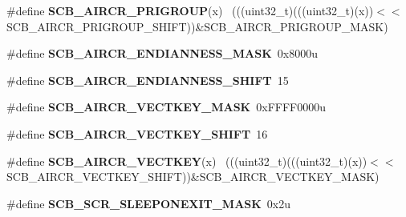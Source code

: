 \begin{DoxyCompactItemize}
\item 
\hypertarget{group___s_c_b___register___masks_ga0d0b66c12d03ab86d7027dbee98ee088}{}\#define {\bfseries S\+C\+B\+\_\+\+A\+I\+R\+C\+R\+\_\+\+P\+R\+I\+G\+R\+O\+U\+P}(x)                                    ~(((uint32\+\_\+t)(((uint32\+\_\+t)(x))$<$$<$S\+C\+B\+\_\+\+A\+I\+R\+C\+R\+\_\+\+P\+R\+I\+G\+R\+O\+U\+P\+\_\+\+S\+H\+I\+F\+T))\&S\+C\+B\+\_\+\+A\+I\+R\+C\+R\+\_\+\+P\+R\+I\+G\+R\+O\+U\+P\+\_\+\+M\+A\+S\+K)\label{group___s_c_b___register___masks_ga0d0b66c12d03ab86d7027dbee98ee088}

\item 
\hypertarget{group___s_c_b___register___masks_gad1fa2d88f03b66dea86171ebb636d936}{}\#define {\bfseries S\+C\+B\+\_\+\+A\+I\+R\+C\+R\+\_\+\+E\+N\+D\+I\+A\+N\+N\+E\+S\+S\+\_\+\+M\+A\+S\+K}~0x8000u\label{group___s_c_b___register___masks_gad1fa2d88f03b66dea86171ebb636d936}

\item 
\hypertarget{group___s_c_b___register___masks_ga2ac1c32de13b48a92bc48bbcee891976}{}\#define {\bfseries S\+C\+B\+\_\+\+A\+I\+R\+C\+R\+\_\+\+E\+N\+D\+I\+A\+N\+N\+E\+S\+S\+\_\+\+S\+H\+I\+F\+T}~15\label{group___s_c_b___register___masks_ga2ac1c32de13b48a92bc48bbcee891976}

\item 
\hypertarget{group___s_c_b___register___masks_ga0929f6fe9ab80dd345abdc59f44fc492}{}\#define {\bfseries S\+C\+B\+\_\+\+A\+I\+R\+C\+R\+\_\+\+V\+E\+C\+T\+K\+E\+Y\+\_\+\+M\+A\+S\+K}~0x\+F\+F\+F\+F0000u\label{group___s_c_b___register___masks_ga0929f6fe9ab80dd345abdc59f44fc492}

\item 
\hypertarget{group___s_c_b___register___masks_ga81e3a91d7ab352abfc1227b928677c37}{}\#define {\bfseries S\+C\+B\+\_\+\+A\+I\+R\+C\+R\+\_\+\+V\+E\+C\+T\+K\+E\+Y\+\_\+\+S\+H\+I\+F\+T}~16\label{group___s_c_b___register___masks_ga81e3a91d7ab352abfc1227b928677c37}

\item 
\hypertarget{group___s_c_b___register___masks_ga40e0d3e5c8c9f49623df8ef272c987dd}{}\#define {\bfseries S\+C\+B\+\_\+\+A\+I\+R\+C\+R\+\_\+\+V\+E\+C\+T\+K\+E\+Y}(x)                                      ~(((uint32\+\_\+t)(((uint32\+\_\+t)(x))$<$$<$S\+C\+B\+\_\+\+A\+I\+R\+C\+R\+\_\+\+V\+E\+C\+T\+K\+E\+Y\+\_\+\+S\+H\+I\+F\+T))\&S\+C\+B\+\_\+\+A\+I\+R\+C\+R\+\_\+\+V\+E\+C\+T\+K\+E\+Y\+\_\+\+M\+A\+S\+K)\label{group___s_c_b___register___masks_ga40e0d3e5c8c9f49623df8ef272c987dd}

\item 
\hypertarget{group___s_c_b___register___masks_ga14474f291208128b6d817bd48c684fc9}{}\#define {\bfseries S\+C\+B\+\_\+\+S\+C\+R\+\_\+\+S\+L\+E\+E\+P\+O\+N\+E\+X\+I\+T\+\_\+\+M\+A\+S\+K}~0x2u\label{group___s_c_b___register___masks_ga14474f291208128b6d817bd48c684fc9}


\end{DoxyCompactItemize}
